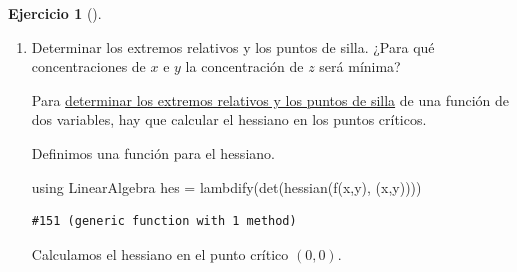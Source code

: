 \documentclass[
  a4paper,
]{scrreport}
\newenvironment{Shaded}{\begin{snugshade}}{\end{snugshade}}
\newcommand{\BuiltInTok}[1]{\textcolor[rgb]{0.00,0.23,0.31}{#1}}
\newcommand{\FunctionTok}[1]{\textcolor[rgb]{0.28,0.35,0.67}{#1}}
\newcommand{\ImportTok}[1]{\textcolor[rgb]{0.00,0.46,0.62}{#1}}
\newcommand{\NormalTok}[1]{\textcolor[rgb]{0.00,0.23,0.31}{#1}}
\newcommand{\OperatorTok}[1]{\textcolor[rgb]{0.37,0.37,0.37}{#1}}
\theoremstyle{definition}
\newtheorem{exercise}{Ejercicio}[chapter]
\theoremstyle{remark}
\begin{document}
\begin{exercise}[]
\begin{enumerate}
\begin{tcolorbox}
  \end{tcolorbox}
\item
  Determinar los extremos relativos y los puntos de silla. ¿Para qué
  concentraciones de \(x\) e \(y\) la concentración de \(z\) será
  mínima?

  \begin{tcolorbox}[enhanced jigsaw, bottomtitle=1mm, rightrule=.15mm, left=2mm, colback=white, title=\textcolor{quarto-callout-note-color}{\faInfo}\hspace{0.5em}{Ayuda}, bottomrule=.15mm, colframe=quarto-callout-note-color-frame, toprule=.15mm, leftrule=.75mm, opacityback=0, coltitle=black, breakable, colbacktitle=quarto-callout-note-color!10!white, arc=.35mm, toptitle=1mm, titlerule=0mm, opacitybacktitle=0.6]

  Para
  \href{https://aprendeconalf.es/analisis-manual/13-derivadas-funciones-varias-variables.html\#thm-extremos-funcion-dos-variables}{determinar
  los extremos relativos y los puntos de silla} de una función de dos
  variables, hay que calcular el hessiano en los puntos críticos.

  \end{tcolorbox}

  \begin{tcolorbox}[enhanced jigsaw, bottomtitle=1mm, rightrule=.15mm, left=2mm, colback=white, title=\textcolor{quarto-callout-tip-color}{\faLightbulb}\hspace{0.5em}{Solución}, bottomrule=.15mm, colframe=quarto-callout-tip-color-frame, toprule=.15mm, leftrule=.75mm, opacityback=0, coltitle=black, breakable, colbacktitle=quarto-callout-tip-color!10!white, arc=.35mm, toptitle=1mm, titlerule=0mm, opacitybacktitle=0.6]

  Definimos una función para el hessiano.

\begin{Shaded}
\begin{Highlighting}[]
\ImportTok{using} \BuiltInTok{LinearAlgebra}
\NormalTok{hes }\OperatorTok{=} \FunctionTok{lambdify}\NormalTok{(}\FunctionTok{det}\NormalTok{(}\FunctionTok{hessian}\NormalTok{(}\FunctionTok{f}\NormalTok{(x,y), (x,y))))}
\end{Highlighting}
\end{Shaded}

\begin{verbatim}
#151 (generic function with 1 method)
\end{verbatim}

  Calculamos el hessiano en el punto crítico \((0,0)\).


\end{tcolorbox}
\end{enumerate}
\end{exercise}
\end{document}
